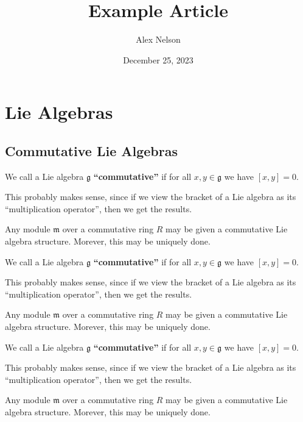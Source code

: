 \documentclass[twoside,chapter=5]{bourbaki}
\title{Example Article}
\author{Alex Nelson}
\date{December 25, 2023}
\def\define#1{\textbf{``#1''}}
\begin{document}
\maketitle

\section{Lie Algebras}

\subsection{Commutative Lie Algebras}

\begin{definition}
We call a Lie algebra $\mathfrak{g}$ \define{commutative} if for all
$x,y\in\mathfrak{g}$ we have $[x,y]=0$.
\end{definition}

\begin{remark}
This probably makes sense, since if we view the bracket of a Lie algebra
as its ``multiplication operator'', then we get the results.
\end{remark}

\begin{proposition}
Any module $\mathfrak{m}$ over a commutative ring $R$ may be given a
commutative Lie algebra structure. Morever, this may be uniquely done.
\end{proposition}


\vfill\eject


\begin{definition}
We call a Lie algebra $\mathfrak{g}$ \define{commutative} if for all
$x,y\in\mathfrak{g}$ we have $[x,y]=0$.
\end{definition}

\begin{remark}
This probably makes sense, since if we view the bracket of a Lie algebra
as its ``multiplication operator'', then we get the results.
\end{remark}

\begin{proposition}
Any module $\mathfrak{m}$ over a commutative ring $R$ may be given a
commutative Lie algebra structure. Morever, this may be uniquely done.
\end{proposition}


\vfill\eject


\begin{definition}
We call a Lie algebra $\mathfrak{g}$ \define{commutative} if for all
$x,y\in\mathfrak{g}$ we have $[x,y]=0$.
\end{definition}

\begin{remark}
This probably makes sense, since if we view the bracket of a Lie algebra
as its ``multiplication operator'', then we get the results.
\end{remark}

\begin{proposition}
Any module $\mathfrak{m}$ over a commutative ring $R$ may be given a
commutative Lie algebra structure. Morever, this may be uniquely done.
\end{proposition}
\end{document}
